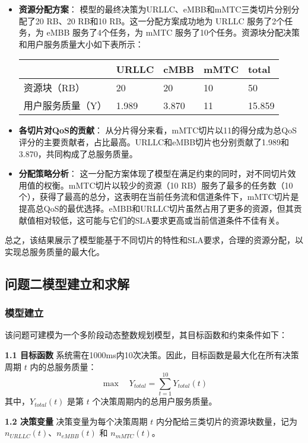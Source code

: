 \documentclass{ctexart}
\begin{document}
\begin{itemize}
 \item \textbf{资源分配方案}：
 模型的最终决策为URLLC、eMBB和mMTC三类切片分别分配了20 RB、20 RB和10 RB。这一分配方案成功地为 URLLC 服务了2个任务，为 eMBB 服务了4个任务，为 mMTC 服务了10个任务。资源块分配决策和用户服务质量大小如下表所示：

 \begin{table}
\centering
\begin{tabular}{lllll} 
\hline
 & URLLC & cMBB & mMTC & total \\ 
\hline
资源块（RB） & 20 & 20 & 10 & 50 \\
用户服务质量（Y） & 1.989 & 3.870 & 11 & 15.859 \\
\hline
\end{tabular}
\end{table}
 \newpage
 \item \textbf{各切片对QoS的贡献}：
 从分片得分来看，mMTC切片以11的得分成为总QoS评分的主要贡献者，占比最高。URLLC和eMBB切片也分别贡献了1.989和3.870，共同构成了总服务质量。

 \item \textbf{分配策略分析}：
 这一分配方案体现了模型在满足约束的同时，对不同切片效用值的权衡。mMTC切片以较少的资源（10 RB）服务了最多的任务数（10个），获得了最高的总分，这表明在当前任务流和信道条件下，mMTC切片是提高总QoS的最优选择。eMBB和URLLC切片虽然占用了更多的资源，但其贡献值相对较低，这可能与它们的SLA要求更高或当前信道条件不佳有关。
\end{itemize}

总之，该结果展示了模型能基于不同切片的特性和SLA要求，合理的资源分配，以实现总服务质量的最大化。

\subsection{问题二模型建立和求解}
\subsubsection{模型建立}
该问题可建模为一个多阶段动态整数规划模型，其目标函数和约束条件如下：

\textbf{1.1 目标函数}
系统需在1000ms内10次决策。因此，目标函数是最大化在所有决策周期 $t$ 内的总服务质量：
$$\max \quad Y_{total} = \sum_{t=1}^{10} Y_{total}(t)$$
其中，$Y_{total}(t)$ 是第 $t$ 个决策周期内的总用户服务质量。

\textbf{1.2 决策变量}
决策变量为每个决策周期 $t$ 内分配给三类切片的资源块数量，记为 $n_{URLLC}(t)$、$n_{eMBB}(t)$ 和 $n_{mMTC}(t)$。
\end{document}
